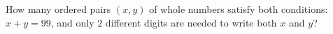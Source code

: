 How many ordered pairs $(x,y)$ of whole numbers satisfy both conditions: $x+y=99$, and only $2$ different digits are needed to write both $x$ and $y$?
